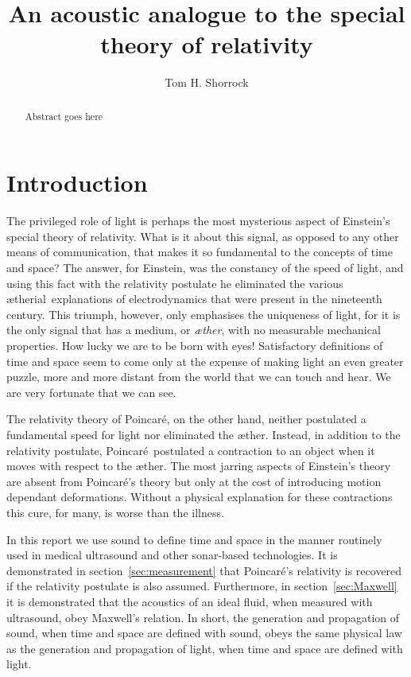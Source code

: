 \documentclass[10pt, fleqn,draft,showtrims,oldfontcommands]{article} %
\title{An acoustic analogue to the special theory of relativity}
\author{Tom H. Shorrock }
\newcommand{\aether}{\ae ther}
\newcommand{\aetherial}{\ae therial}
\newcommand{\Poincare}{Poincar{\'e}}
\begin{document}
\maketitle
\begin{abstract}
Abstract goes here
\end{abstract}

\section{Introduction}\label{sec:introduction}

The privileged role of light is perhaps the most mysterious aspect of Einstein's special theory of relativity.
What is it about this signal, as opposed to any other means of communication, that makes it  so fundamental to the  concepts of time and space?
The answer, for Einstein, was the constancy of the speed of light,
and using this fact with the relativity postulate he eliminated the  various \aetherial\ explanations of electrodynamics that were present in the nineteenth century.
This triumph, however, only emphasises the uniqueness of light, for it is the  only  signal that has a  medium, or {\em \aether}, with no measurable mechanical properties.
How lucky we are to be born with eyes! %
Satisfactory definitions of time and space seem to come only at the expense of making light  an even greater puzzle,
more and more distant from the world that we can touch and hear.
We are very fortunate that we can see.

The relativity theory of \Poincare, on the other hand,  neither  postulated  a fundamental speed for light nor eliminated the \aether.
Instead, in addition to the relativity postulate, \Poincare\ postulated a  contraction to an object  when it moves with respect to the \aether.
The most jarring aspects of Einstein's theory are absent from \Poincare's theory but only at the cost of introducing motion dependant deformations.
Without a  physical explanation for these contractions
this cure, for many, is worse than the illness.

In this report we use sound to define time and space 
in the manner  routinely used in medical ultrasound and other sonar-based technologies.
It is demonstrated in section~\ref{sec:measurement} that \Poincare's relativity is recovered if the relativity postulate is also assumed.
Furthermore, in section~\ref{sec:Maxwell} it is demonstrated that the acoustics of an ideal fluid, when measured with ultrasound, 
obey Maxwell's relation.
In short, the generation and propagation of sound,  when time and space are defined with  sound,
obeys the same physical law as the generation and propagation of light,  when time and space are defined with light.
\end{document}
